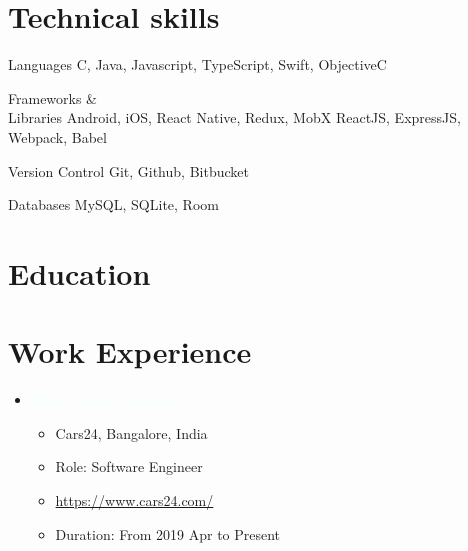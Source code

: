 \documentclass[11pt,a4paper]{moderncv}
\begin{document}
\maketitle

\section{Technical skills}

    \bigbreak    
    
    \cvcomputer
	{Languages}
           {C, Java, Javascript, TypeScript, Swift, ObjectiveC}{}{}
      
    \cvcomputer
	{Frameworks \&\\Libraries}
           {Android, iOS, React Native, Redux, MobX}
           {}{ReactJS, ExpressJS, Webpack, Babel}

    \cvcomputer
	 {Version Control}
           {Git, Github, Bitbucket}{}{}
    
    \cvcomputer
	 {Databases}
           {MySQL, SQLite, Room}{}{}

\section{Education}
    
    \bigbreak
    

\section{Work Experience}

     \bigbreak
    
     \begin{itemize}
	 \item {\textcolor{azure}{React Native Developer}}
         \begin{itemize}
		     \item Cars24, Bangalore, India
		     \item Role: Software Engineer
		     \item {\url{https://www.cars24.com/}}
		     \item Duration: From 2019 Apr to Present
	 	\end{itemize}
     \end{itemize}

     \bigbreak
    
\end{document}
